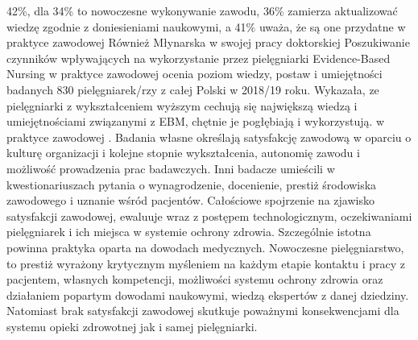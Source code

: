 \documentclass[a4paper,12pt,twoside,openany]{report}
\begin{document}
42\%, dla 34\% to nowoczesne wykonywanie zawodu, 36\% zamierza aktualizować wiedzę zgodnie z doniesieniami naukowymi, a 41\% uważa, że są one przydatne w praktyce zawodowej \cite{gotlib} Również Młynarska w swojej pracy doktorskiej  Poszukiwanie czynników wpływających na wykorzystanie przez pielęgniarki Evidence-Based Nursing w praktyce zawodowej ocenia poziom wiedzy, postaw i umiejętności badanych 830 pielęgniarek/rzy z całej Polski  w 2018/19 roku. Wykazała, ze pielęgniarki z wykształceniem wyższym cechują się największą wiedzą i umiejętnościami związanymi z EBM, chętnie je  pogłębiają i wykorzystują. w praktyce zawodowej \cite{ EBM}. Badania własne określają satysfakcję zawodową w oparciu o kulturę organizacji i kolejne stopnie wykształcenia, autonomię zawodu i możliwość prowadzenia prac badawczych. Inni badacze umieścili w kwestionariuszach pytania o wynagrodzenie, docenienie, prestiż środowiska zawodowego i uznanie wśród pacjentów. Całościowe spojrzenie na zjawisko satysfakcji zawodowej, ewaluuje wraz z postępem technologicznym, oczekiwaniami pielęgniarek i ich miejsca w systemie ochrony zdrowia. Szczególnie istotna powinna praktyka oparta na dowodach medycznych. Nowoczesne pielęgniarstwo, to prestiż wyrażony krytycznym myśleniem na każdym etapie kontaktu i pracy z pacjentem, własnych kompetencji, możliwości systemu ochrony zdrowia oraz działaniem popartym dowodami naukowymi, wiedzą ekspertów z danej dziedziny. Natomiast brak satysfakcji zawodowej skutkuje poważnymi konsekwencjami dla systemu opieki zdrowotnej jak i samej pielęgniarki.

\end{document}
